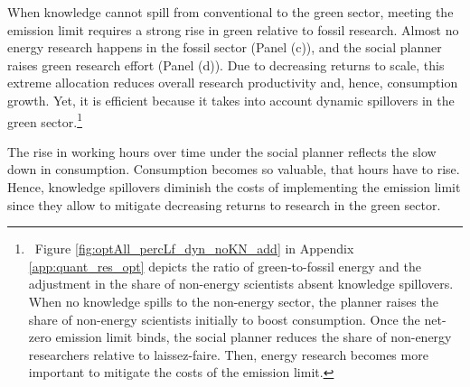  When knowledge cannot spill from conventional to the green sector, meeting the emission limit requires a strong rise in green relative to fossil research. Almost no energy research happens in the fossil sector (Panel (c)), and the social planner raises green research effort (Panel (d)). Due to decreasing returns to scale, this extreme allocation reduces overall research productivity and, hence, consumption growth. Yet, it is efficient because it takes into account dynamic spillovers in the green sector.\footnote{\ Figure \ref{fig:optAll_percLf_dyn_noKN_add} in Appendix \ref{app:quant_res_opt} depicts the ratio of green-to-fossil energy and the adjustment in the share of non-energy scientists absent knowledge spillovers. When no knowledge spills to the non-energy sector, the planner raises the share of non-energy scientists initially to boost consumption. Once the net-zero emission limit binds, the social planner reduces the share of non-energy researchers relative to laissez-faire. Then, energy research becomes more important to mitigate the costs of the emission limit.}
 
The rise in working hours over time under the social planner reflects the slow down in consumption. Consumption becomes so valuable, that hours have to rise. 
Hence, knowledge spillovers diminish the costs of implementing the emission limit since they allow to mitigate decreasing returns to research in the green sector. 


